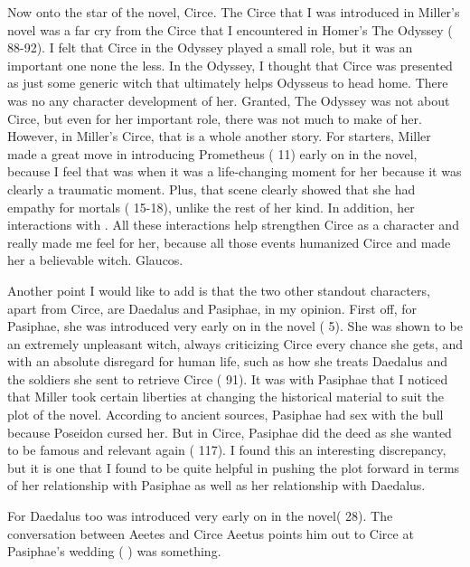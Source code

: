 \documentclass[12pt, a4paper]{article}
\begin{document}
Now onto the star of the novel, Circe. The Circe that I was introduced in Miller's novel was a far cry from the Circe that I encountered in Homer's The Odyssey (\cite{homer_odyssey_1998} 88-92). I felt that Circe in the Odyssey played a small role, but it was an important one none the less. In the Odyssey, I thought that Circe was presented as just some generic witch that ultimately helps Odysseus to head home. There was no any character development of her. Granted, The Odyssey was not about Circe, but even for her important role, there was not much to make of her. However, in Miller's Circe, that is a whole another story. For starters, Miller made a great move in introducing Prometheus (\cite{miller_circe_2018} 11) early on in the novel, because I feel that was when it was a life-changing moment for her because it was clearly a traumatic moment. Plus, that scene clearly showed that she had empathy for mortals (\cite{miller_circe_2018} 15-18), unlike the rest of her kind. In addition, her interactions with . All these interactions help strengthen Circe as a character and really made me feel for her, because all those events humanized Circe and made her a believable witch. Glaucos.

Another point I would like to add is that the two other standout characters, apart from Circe, are Daedalus and Pasiphae, in my opinion. First off, for Pasiphae, she was introduced very early on in the novel (\cite{miller_circe_2018} 5). She was shown to be an extremely unpleasant witch, always criticizing Circe every chance she gets, and with an absolute disregard for human life, such as how she treats Daedalus and the soldiers she sent to retrieve Circe (\cite{miller_circe_2018} 91). It was with Pasiphae that I noticed that Miller took certain liberties at changing the historical material to suit the plot of the novel. According to ancient sources, Pasiphae had sex with the bull because Poseidon cursed her. But in Circe, Pasiphae did the deed as she wanted to be famous and relevant again (\cite{miller_circe_2018} 117). I found this an interesting discrepancy, but it is one that I found to be quite helpful in pushing the plot forward in terms of her relationship with Pasiphae as well as her relationship with Daedalus.

For Daedalus too was introduced very early on in the novel(\cite{miller_circe_2018} 28). The conversation between Aeetes and Circe Aeetus points him out to Circe at Pasiphae's wedding (\cite{miller_circe_2018} ) was something.
\end{document}
